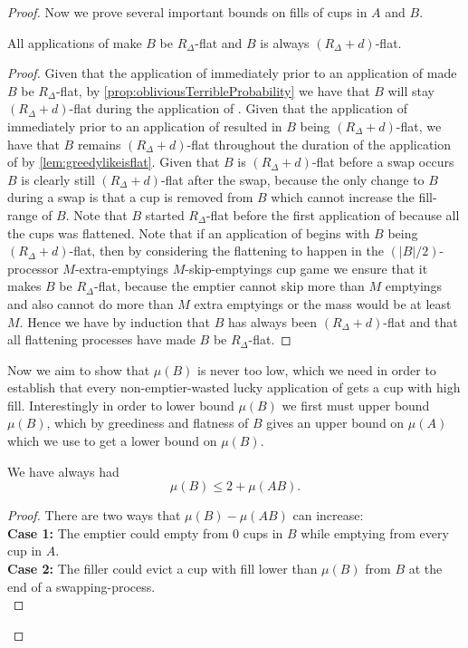 \begin{proof}
Now we prove several important bounds on fills of cups in $A$ and $B$.
\begin{clm}
  \label{clm:allflatteningsworkbyM}
  All applications of \flatalg make $B$ be $R_\Delta$-flat and
  $B$ is always $(R_\Delta + d)$-flat.
\end{clm}
\begin{proof}
  Given that the application of \flatalg immediately prior to an application
  of \randalg made $B$ be $R_\Delta$-flat, by
  \cref{prop:obliviousTerribleProbability} we have that $B$ will
  stay $(R_\Delta + d)$-flat during the application of \randalg. 
  Given that the application of \randalg immediately prior to an
  application of \flatalg resulted in $B$ being $(R_\Delta
  + d)$-flat, we have that $B$ remains $(R_\Delta + d)$-flat
  throughout the duration of the application of \flatalg by
  \cref{lem:greedylikeisflat}. Given that $B$ is $(R_\Delta +
  d)$-flat before a swap occurs $B$ is clearly still $(R_\Delta +
  d)$-flat after the swap, because the only change to $B$ during
  a swap is that a cup is removed from $B$ which cannot increase
  the fill-range of $B$.
  Note that $B$ started $R_\Delta$-flat before the first
  application of \flatalg because all the cups was flattened.
  Note that if an application of \flatalg begins with $B$ being
  $(R_\Delta + d)$-flat, then by considering the flattening to
  happen in the $(|B|/2)$-processor $M$-extra-emptyings
  $M$-skip-emptyings cup game we ensure that it makes $B$ be
  $R_\Delta$-flat, because the emptier cannot skip more than $M$
  emptyings and also cannot do more than $M$ extra emptyings or
  the mass would be at least $M$.
  Hence we have by induction that $B$ has always been $(R_\Delta
  + d)$-flat and that all flattening processes have made $B$ be
  $R_\Delta$-flat. 
\end{proof}

Now we aim to show that $\mu(B)$ is never too low, which we need
in order to establish that every non-emptier-wasted lucky
application of \randalg gets a cup with high fill. Interestingly
in order to lower bound $\mu(B)$ we first must upper bound
$\mu(B)$, which by greediness and flatness of $B$ gives an upper
bound on $\mu(A)$ which we use to get a lower bound on $\mu(B)$.

\begin{clm}
  \label{clm:muBdoesntgettoobig}
  We have always had
  $$\mu(B) \le 2 + \mu(A B).$$
\end{clm}
\begin{proof}
  There are two ways that $\mu(B)-\mu(A B)$ can increase: \\
  \textbf{Case 1:}
  The emptier could empty from $0$ cups in $B$ while emptying
  from every cup in $A$. \\
  \textbf{Case 2:}
  The filler could evict a cup with fill lower than $\mu(B)$ from
  $B$ at the end of a swapping-process. \\


\end{proof}
\end{proof}
